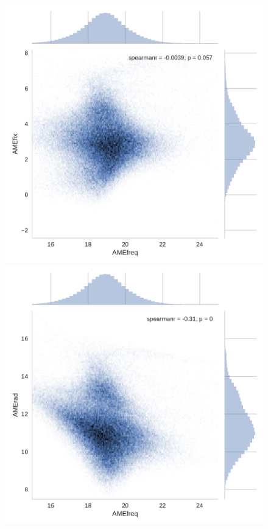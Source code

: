        \begin{figure}
         \includegraphics[width=\textwidth/3]{../Plots/ch_allsky/AMEfreq_vs_fix.pdf}
         \includegraphics[width=\textwidth/3]{../Plots/ch_allsky/AMEfreq_vs_rad.pdf}

\end{figure}
